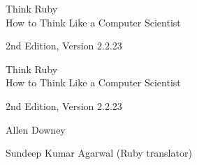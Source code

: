 \documentclass[10pt]{book}
\newcommand{\theversion}{2nd Edition, Version 2.2.23}
\newcommand{\thedate}{}
\begin{document}
\begin{latexonly}

\renewcommand{\blankpage}{\thispagestyle{empty} \quad \newpage}



\thispagestyle{empty}

\begin{flushright}
\vspace*{2.0in}

\begin{spacing}{3}
{\huge Think Ruby}\\
{\Large How to Think Like a Computer Scientist}
\end{spacing}

\vspace{0.25in}

\theversion

\thedate

\vfill

\end{flushright}


\blankpage
\blankpage

\pagebreak
\thispagestyle{empty}

\begin{flushright}
\vspace*{2.0in}

\begin{spacing}{3}
{\huge Think Ruby}\\
{\Large How to Think Like a Computer Scientist}
\end{spacing}

\vspace{0.25in}

\theversion

\thedate

\vspace{1in}


{\Large
Allen Downey\\
}

{\small Sundeep Kumar Agarwal (Ruby translator)}

\vspace{0.5in}


\end{flushright}
\end{latexonly}
\end{document}
